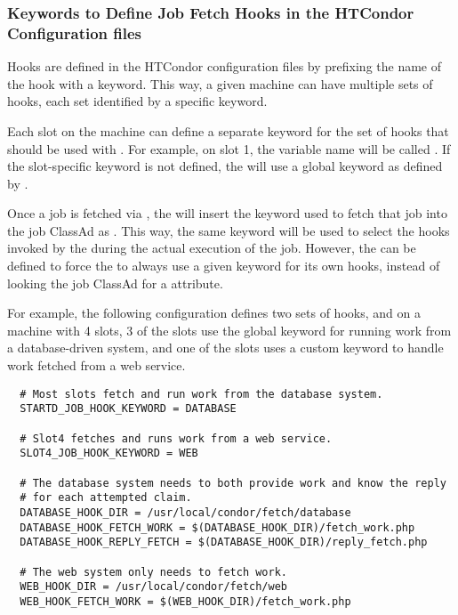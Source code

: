 \subsubsection{\label{sec:job-hooks-keywords}
Keywords to Define Job Fetch Hooks in the HTCondor Configuration files }

Hooks are defined in the HTCondor configuration files by prefixing
the name of the hook with a keyword.
This way, a given machine can have multiple sets of hooks, each set
identified by a specific keyword.

Each slot on the machine can define a separate keyword for the set
of hooks that should be used with .
For example, on slot 1, the variable name will be
called .
If the slot-specific keyword is not defined, the  will
use a global keyword as defined by .

Once a job is fetched via , the
 will insert the keyword used to fetch that job into
the job ClassAd as .
This way, the same keyword will be used to select the hooks invoked by
the  during the actual execution of the job.
However, the  can be defined to
force the  to always use a given keyword for its own
hooks, instead of looking the job ClassAd for a 
attribute.

For example, the following configuration defines two sets of hooks,
and on a machine with 4 slots, 3 of the slots use the global keyword
for running work from a database-driven system, and one of the slots
uses a custom keyword to handle work fetched from a web service.
\footnotesize
\begin{verbatim}
  # Most slots fetch and run work from the database system.
  STARTD_JOB_HOOK_KEYWORD = DATABASE

  # Slot4 fetches and runs work from a web service.
  SLOT4_JOB_HOOK_KEYWORD = WEB

  # The database system needs to both provide work and know the reply
  # for each attempted claim.
  DATABASE_HOOK_DIR = /usr/local/condor/fetch/database
  DATABASE_HOOK_FETCH_WORK = $(DATABASE_HOOK_DIR)/fetch_work.php
  DATABASE_HOOK_REPLY_FETCH = $(DATABASE_HOOK_DIR)/reply_fetch.php

  # The web system only needs to fetch work.
  WEB_HOOK_DIR = /usr/local/condor/fetch/web
  WEB_HOOK_FETCH_WORK = $(WEB_HOOK_DIR)/fetch_work.php
\end{verbatim}
\normalsize

